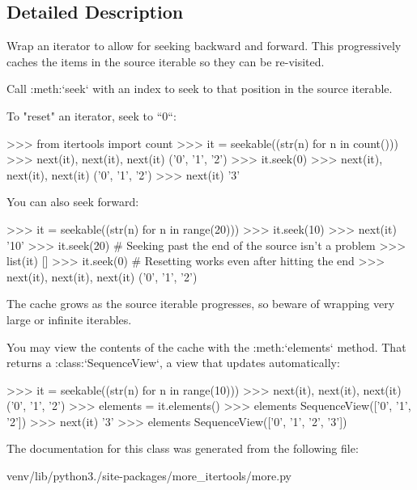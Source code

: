 \subsection{Detailed Description}
\begin{DoxyVerb}Wrap an iterator to allow for seeking backward and forward. This
progressively caches the items in the source iterable so they can be
re-visited.

Call :meth:`seek` with an index to seek to that position in the source
iterable.

To "reset" an iterator, seek to ``0``:

    >>> from itertools import count
    >>> it = seekable((str(n) for n in count()))
    >>> next(it), next(it), next(it)
    ('0', '1', '2')
    >>> it.seek(0)
    >>> next(it), next(it), next(it)
    ('0', '1', '2')
    >>> next(it)
    '3'

You can also seek forward:

    >>> it = seekable((str(n) for n in range(20)))
    >>> it.seek(10)
    >>> next(it)
    '10'
    >>> it.seek(20)  # Seeking past the end of the source isn't a problem
    >>> list(it)
    []
    >>> it.seek(0)  # Resetting works even after hitting the end
    >>> next(it), next(it), next(it)
    ('0', '1', '2')

The cache grows as the source iterable progresses, so beware of wrapping
very large or infinite iterables.

You may view the contents of the cache with the :meth:`elements` method.
That returns a :class:`SequenceView`, a view that updates automatically:

    >>> it = seekable((str(n) for n in range(10)))
    >>> next(it), next(it), next(it)
    ('0', '1', '2')
    >>> elements = it.elements()
    >>> elements
    SequenceView(['0', '1', '2'])
    >>> next(it)
    '3'
    >>> elements
    SequenceView(['0', '1', '2', '3'])\end{DoxyVerb}
 

The documentation for this class was generated from the following file\+:\begin{DoxyCompactItemize}
\item 
venv/lib/python3./site-\/packages/more\+\_\+itertools/more.\+py\end{DoxyCompactItemize}
